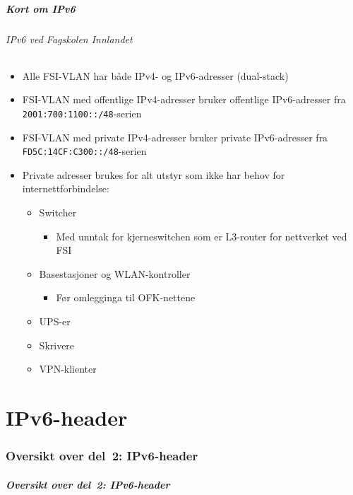 \begin{frame}%
  \frametitle{Kort om IPv6}
  \framesubtitle{IPv6 ved Fagskolen Innlandet}
  \begin{itemize}[<+->]
  \item Alle FSI-VLAN har både IPv4- og IPv6-adresser (dual-stack)
  \item FSI-VLAN med offentlige IPv4-adresser bruker offentlige
    IPv6-adresser fra \texttt{2001:700:1100::/48}-serien
  \item FSI-VLAN med private IPv4-adresser  bruker private
    IPv6-adresser fra \texttt{FD5C:14CF:C300::/48}-serien
  \item Private adresser brukes for alt utstyr som ikke har behov for
    internettforbindelse:
    \begin{itemize}[<+->]
    \item Switcher
      \begin{itemize}[<+->]
      \item Med unntak for kjerneswitchen som er L3-router for
        nettverket ved FSI
      \end{itemize}
    \item Basestasjoner og WLAN-kontroller
      \begin{itemize}[<+->]
      \item Før omlegginga til OFK-nettene
      \end{itemize}
    \item UPS-er
    \item Skrivere
    \item VPN-klienter
    \end{itemize}
  \end{itemize}
\end{frame}

\part{IPv6-header}

\begin{frame}
  \partpage
\end{frame}

\section*{Oversikt over del~2: IPv6-header}
\begin{frame}[allowframebreaks]
  \frametitle{Oversikt over del~2: IPv6-header}
    \tableofcontents%
\end{frame}

